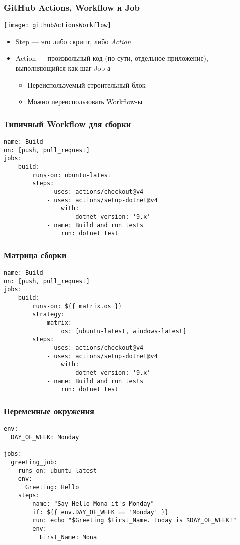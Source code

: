 \documentclass{../../slides-style}
\begin{document}
    \begin{frame}
        \frametitle{GitHub Actions, Workflow и Job}
        \begin{center}
            \texttt{[image: githubActionsWorkflow]}
        \end{center}
        \begin{itemize}
            \item Step --- это либо скрипт, либо \emph{Action}
            \item Action --- произвольный код (по сути, отдельное приложение), выполняющийся как шаг Job-а
            \begin{itemize}
                \item Переиспользуемый строительный блок
                \item Можно переиспользовать Workflow-ы
            \end{itemize}
        \end{itemize}
    \end{frame}

    \begin{frame}[fragile]
        \frametitle{Типичный Workflow для сборки}
        \begin{verbatim}
name: Build
on: [push, pull_request]
jobs:
    build:
        runs-on: ubuntu-latest
        steps:
            - uses: actions/checkout@v4
            - uses: actions/setup-dotnet@v4
                with:
                    dotnet-version: '9.x'
            - name: Build and run tests
                run: dotnet test
        \end{verbatim}
    \end{frame}

    \begin{frame}[fragile]
        \frametitle{Матрица сборки}
        \begin{verbatim}
name: Build
on: [push, pull_request]
jobs:
    build:
        runs-on: ${{ matrix.os }}
        strategy:
            matrix:
                os: [ubuntu-latest, windows-latest]
        steps:
            - uses: actions/checkout@v4
            - uses: actions/setup-dotnet@v4
                with:
                    dotnet-version: '9.x'
            - name: Build and run tests
                run: dotnet test
        \end{verbatim}
    \end{frame}

    \begin{frame}[fragile]
        \frametitle{Переменные окружения}
        \begin{scriptsize}
            \begin{verbatim}
env:
  DAY_OF_WEEK: Monday

jobs:
  greeting_job:
    runs-on: ubuntu-latest
    env:
      Greeting: Hello
    steps:
      - name: "Say Hello Mona it's Monday"
        if: ${{ env.DAY_OF_WEEK == 'Monday' }}
        run: echo "$Greeting $First_Name. Today is $DAY_OF_WEEK!"
        env:
          First_Name: Mona
            \end{verbatim}
        \end{scriptsize}
    \end{frame}
\end{document}
